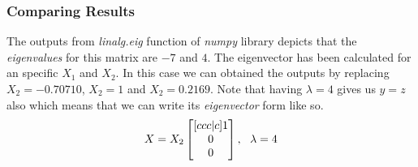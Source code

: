 \documentclass[12pt]{article}
\numberwithin{equation}{section}
\numberwithin{table}{section}
\numberwithin{figure}{section}
\begin{document}
\subsubsection*{Comparing Results}
The outputs from \textit{linalg.eig} function of \textit{numpy} library depicts that the \textit{eigenvalues} for this matrix are $-7$ and $4$. The eigenvector has been calculated for an specific $X_1$ and $X_2$. In this case we can obtained the outputs by replacing $X_2 = -0.70710$, $X_2 = 1$ and $X_2=0.2169$. Note that having $\lambda = 4$ gives us $y=z$ also which means that we can write its \textit{eigenvector} form like so.
$$
X =  X_2 \renewcommand\arraystretch{1}
\setlength\arraycolsep{6pt}
\begin{bmatrix}[ccc|c]
1\\	
0\\
0\\
\end{bmatrix} , \ \ \lambda = 4
$$
\end{document}
